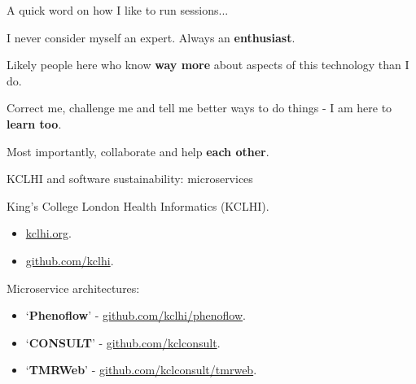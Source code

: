\documentclass[10pt, dvipsnames, table, aspectratio=169]{beamer}
\begin{document}

\begin{frame}[fragile]{A quick word on how I like to run sessions...}

I never consider myself an expert. Always an \textbf{enthusiast}.

Likely people here who know \textbf{way more} about aspects of this
technology than I do.

Correct me, challenge me and tell me better ways to do things - I am
here to \textbf{learn too}.

Most importantly, collaborate and help \textbf{each other}.

\end{frame}


\begin{frame}[fragile]{KCLHI and software sustainability: microservices}

King's College London Health Informatics (KCLHI).

\begin{itemize}

    \item \href{https://kclhi.org}{kclhi.org}.
    
    \item \href{https://github.com/kclhi}{github.com/kclhi}.
    
\end{itemize}

Microservice architectures:

\begin{itemize}
    
    \item `\textbf{Phenoflow}' - \href{https://github.com/kclhi/phenoflow}{github.com/kclhi/phenoflow}.
    
    \item `\textbf{CONSULT}' - \href{https://github.com/kclconsult}{github.com/kclconsult}.
    \item `\textbf{TMRWeb}' - \href{https://github.com/kclconsult/tmrweb}{github.com/kclconsult/tmrweb}.
    
\end{itemize}

\end{frame}
\end{document}
